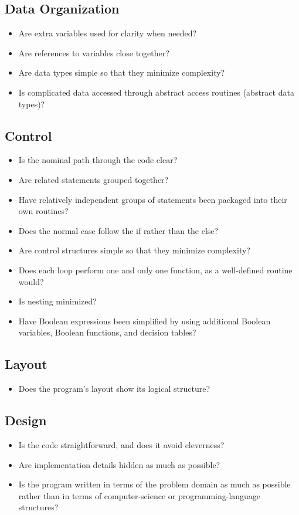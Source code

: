 \subsection{Data Organization}
\begin{itemize}
\item Are extra variables used for clarity when needed?
\item Are references to variables close together?
\item Are data types simple so that they minimize complexity?
\item Is complicated data accessed through abstract access routines (abstract data types)?
\end{itemize}

\subsection{Control}
\begin{itemize}
\item Is the nominal path through the code clear?
\item Are related statements grouped together?
\item Have relatively independent groups of statements been packaged into their own routines?
\item Does the normal case follow the if rather than the else?
\item Are control structures simple so that they minimize complexity?
\item Does each loop perform one and only one function, as a well-defined routine would?
\item Is nesting minimized?
\item Have Boolean expressions been simplified by using additional Boolean variables, Boolean functions, and decision tables?
\end{itemize}

\subsection{Layout}
\begin{itemize}
\item Does the program’s layout show its logical structure?
\end{itemize}

\subsection{Design}
\begin{itemize}
\item Is the code straightforward, and does it avoid cleverness?
\item Are implementation details hidden as much as possible?
\item Is the program written in terms of the problem domain as much as possible rather than in terms of computer-science or programming-language structures?
\end{itemize}

